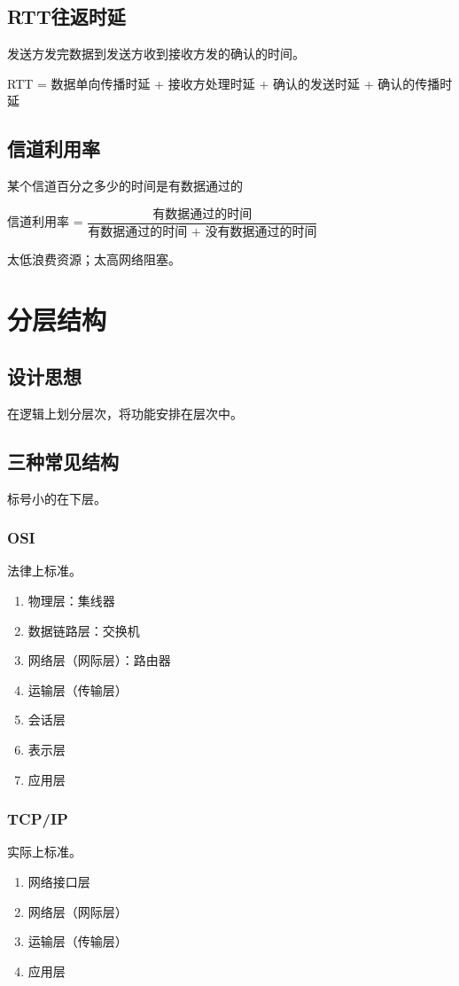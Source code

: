 \subsection{RTT往返时延}
发送方发完数据到发送方收到接收方发的确认的时间。

RTT = 数据单向传播时延 + 接收方处理时延 + 确认的发送时延 + 确认的传播时延


\subsection{信道利用率}
某个信道百分之多少的时间是有数据通过的

信道利用率 = \(\dfrac{\text{有数据通过的时间}}{\text{有数据通过的时间 + 没有数据通过的时间}}\)

太低浪费资源；太高网络阻塞。


\section{分层结构}

\subsection{设计思想}
在逻辑上划分层次，将功能安排在层次中。


\subsection{三种常见结构}
标号小的在下层。

\subsubsection{OSI}
法律上标准。
\begin{enumerate}
    \item 物理层：集线器
    \item 数据链路层：交换机
    \item 网络层（网际层）：路由器
    \item 运输层（传输层）
    \item 会话层
    \item 表示层
    \item 应用层
\end{enumerate}


\subsubsection{TCP/IP}
实际上标准。
\begin{enumerate}
    \item 网络接口层
    \item 网络层（网际层）
    \item 运输层（传输层）
    \item 应用层
\end{enumerate}


